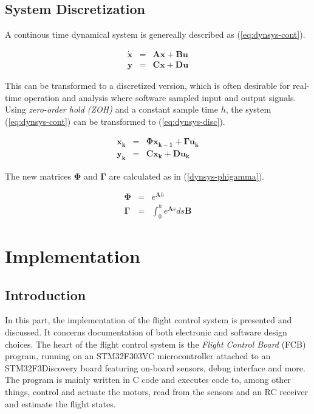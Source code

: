 \documentclass[a4paper]{report}
\begin{document}
\begin{appendices}

\chapter{System Discretization} \label{ch:sysdisc}

A continous time dynamical system is genereally described as (\ref{eq:dynsys-cont}).

\begin{eqnarray}
	\mathbf{\dot{x}} & = & \mathbf{ A x } + \mathbf{ B u } \nonumber \\
	\mathbf{y} & = & \mathbf{Cx} + \mathbf{Du}
	\label{eq:dynsys-cont}
\end{eqnarray}

This can be transformed to a discretized version, which is often desirable for real-time operation and analysis where software sampled input and output signals. Using \emph{zero-order hold (ZOH)} and a constant sample time $h$, the system (\ref{eq:dynsys-cont}) can be transformed to (\ref{eq:dynsys-disc}).

\begin{eqnarray}
\mathbf{x_{k}} & = & \mathbf{\Phi x_{k-1}} + \mathbf{\Gamma u_{k}} \nonumber \\
\mathbf{y_k} & = & \mathbf{C x_k} + \mathbf{D u_k}
\label{eq:dynsys-disc}
\end{eqnarray}

The new matrices $\mathbf{\Phi}$ and $\mathbf{\Gamma}$ are calculated as in (\ref{dynsys-phigamma}).

\begin{eqnarray}
\mathbf{\Phi} & = & e^{\mathbf{A}h} \nonumber \\
\mathbf{\Gamma} & = & \int_{0}^{h} e^{\mathbf{A}s} ds \mathbf{B}
\label{eq:dynsys-disc}
\end{eqnarray}

\end{appendices}

%
%
\part{Implementation}

\chapter{Introduction}
In this part, the implementation of the flight control system is presented and discussed. It concerns documentation of both electronic and software design choices. The heart of the flight control system is the \emph{Flight Control Board} (FCB) program, running on an STM32F303VC microcontroller attached to an STM32F3Discovery board featuring on-board sensors, debug interface and more. The program is mainly written in C code and executes code to, among other things, control and actuate the motors, read from the sensors and an RC receiver and estimate the flight states.
\end{document}
